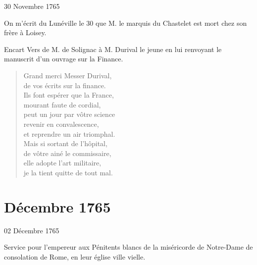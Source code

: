                      \begin{diary}{30 Novembre 1765}{}

                         On m'écrit du Lunéville
                           le 30 que M.
                              le marquis du Chastelet est mort chez
                           son
                              frère à Loisey. \bigskip


                     \end{diary}


                     \begin{diary}{Encart}{} Vers de M. de
                                 Solignac à M.
                                 Durival le jeune en lui renvoyant
                              le manuscrit d'un ouvrage sur la
                                 Finance. \bigskip


                              \begin{verse}Grand merci Messer
                                       Durival,\\de vos écrits sur la finance.\\Ils font espérer que la
                                       France,\\mourant faute de cordial,\\peut un jour par vôtre science\\revenir en convalescence,\\et reprendre un air triomphal.\\Mais si sortant de l'hôpital,\\de vôtre ainé le
                                       commissaire,\\elle adopte l'art militaire,\\je la tient quitte de tout mal.\\\end{verse}
        \bigskip


                           \end{diary}

                  \chapter*{Décembre 1765}



                     \begin{diary}{02 Décembre 1765}{}

                         Service pour l'empereur aux Pénitents blancs
                           de la miséricorde de Notre-Dame de consolation de Rome,
                           en leur église ville
                              vielle. \bigskip


                     \end{diary}

